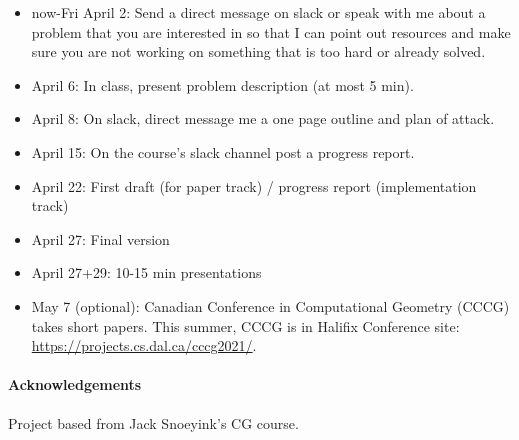 \documentclass[11pt]{article}
\begin{document}
\begin{itemize}

    \item now-Fri April 2: Send a direct message on slack or speak with me about
        a problem that you are interested in so that I can point out resources
        and make sure you are not working on something that is too hard or
        already solved.

    \item April 6: In class, present problem description (at most 5 min).

    \item April 8: On slack, direct message me a one page outline and plan of
        attack.

    \item April 15: On the course's slack channel post a progress report.

    \item April 22: First draft (for paper track) / progress report
        (implementation track)

    \item April 27: Final version

    \item April 27+29: 10-15 min presentations

    \item May 7 (optional): Canadian Conference in Computational Geometry
        (CCCG) takes short papers. This summer, CCCG is in Halifix Conference
        site: \url{https://projects.cs.dal.ca/cccg2021/}.
\end{itemize}

\paragraph{Acknowledgements} Project based from Jack Snoeyink's CG course.
\end{document}
